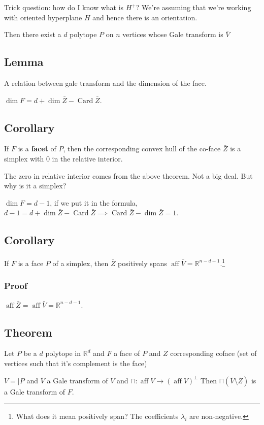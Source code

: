 \documentclass[11pt]{article}
\def\R{\mathbb{R}}
\def\aff{\operatorname{aff}}
\def\card{\operatorname{Card}}
\begin{document}
{{{\begin{enumerate}
Trick question: how do I know what is \(H^{+}\)? We're assuming that we're
working with oriented hyperplane \(H\) and hence there is an orientation.
\end{enumerate}

Then there exist a \(d\) polytope \(P\) on \(n\) vertices whose Gale transform is
\(\bar{V}\)
\subsection{Lemma}
\label{sec:org8184008}
A relation between gale transform and the dimension of the face.

\(\dim F = d + \dim \bar{Z} - \card \bar{Z}\).
\subsection{Corollary}
\label{sec:org1745760}
If \(F\) is a \textbf{facet} of \(P\), then the corresponding convex hull of the co-face
\(\bar{Z}\) is a simplex with \(0\) in the relative interior.

The zero in relative interior comes from the above theorem. Not a big deal.
But why is it a simplex?

\(\dim F = d - 1\), if we put it in the formula, \(d - 1 = d + \dim\bar{Z} -
   \card\bar{Z} \implies \card \bar{Z} - \dim \bar{Z} = 1\).
\subsection{Corollary}
\label{sec:org067c6be}
If \(F\) is a face \(P\) of a simplex, then \(\bar{Z}\) positively spans \(\aff
   \bar{V} = \R^{n-d-1}\).\footnote{What does it mean positively span? The coefficients \(\lambda_i\) are
non-negative.}
\subsubsection{Proof}
\label{sec:orgfff7085}
\(\aff \bar{Z} = \aff \bar{V} = \R^{n - d - 1}\).
\subsection{Theorem}
\label{sec:org3416cf0}
Let \(P\) be a \(d\) polytope in \(\R^d\) and \(F\) a face of \(P\) and \(Z\)
corresponding coface (set of vertices such that it's complement is the face)

\(V = \vert P\) and \(\bar{V}\) a Gale transform of \(V\) and \(\sqcap \colon \aff V
   \rightarrow (\aff V)^\perp\) Then \(\sqcap (\bar V \setminus \bar{Z})\) is a
Gale transform of \(F\).

}}}
\end{document}
